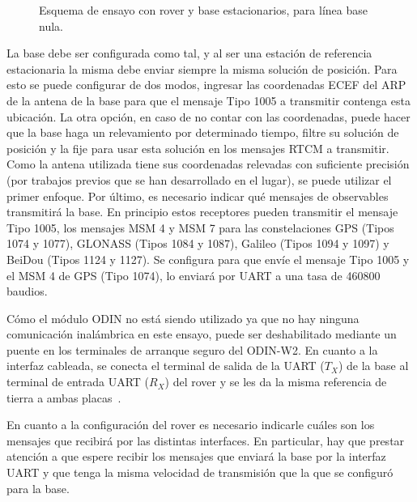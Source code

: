 \documentclass[a4paper,12pt,oneside,onecolumn,final,openright]{book}%
\begin{document}
\begin{figure}
\centering
{}
\centering
{}
\caption{Esquema de ensayo con rover y base estacionarios, para línea base nula.}
\label{fig:EnsayoZBL}
\end{figure}

	La base debe ser configurada como tal, y al ser una estación de referencia estacionaria la misma debe enviar siempre la misma solución de posición. Para esto se puede configurar de dos modos, ingresar las coordenadas ECEF del ARP de la antena de la base para que el mensaje Tipo 1005 a transmitir contenga esta ubicación. La otra opción, en caso de no contar con las coordenadas, puede hacer que la base haga un relevamiento por determinado tiempo, filtre su solución de posición y la fije para usar esta solución en los mensajes RTCM a transmitir. Como la antena utilizada tiene sus coordenadas relevadas con suficiente precisión (por trabajos previos que se han desarrollado en el lugar), se puede utilizar el primer enfoque. Por último, es necesario indicar qué mensajes de observables transmitirá la base. En principio estos receptores pueden transmitir el mensaje Tipo 1005, los mensajes MSM 4 y MSM 7 para las constelaciones GPS (Tipos 1074 y 1077), GLONASS (Tipos 1084 y 1087), Galileo (Tipos 1094 y 1097) y BeiDou (Tipos 1124 y 1127). Se configura para que envíe el mensaje Tipo 1005 y el MSM 4 de GPS (Tipo 1074), lo enviará por UART a una tasa de 460800 baudios.
	
	Cómo el módulo ODIN no está siendo utilizado ya que no hay ninguna comunicación inalámbrica en este ensayo, puede ser deshabilitado mediante un puente en los terminales de arranque seguro del ODIN-W2. En cuanto a la interfaz cableada, se conecta el terminal de salida de la UART ($T_X$) de la base al terminal de entrada UART ($R_X$) del rover y se les da la misma referencia de tierra a ambas placas~\cite{moving_base_AppN}.
	
	En cuanto a la configuración del rover es necesario indicarle cuáles son los mensajes que recibirá por las distintas interfaces. En particular, hay que prestar atención a que espere recibir los mensajes que enviará la base por la interfaz UART y que tenga la misma velocidad de transmisión que la que se configuró para la base.
\end{document}
